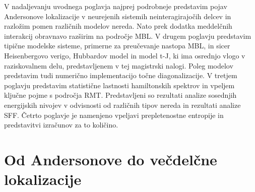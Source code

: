   V nadaljevanju uvodnega poglavja najprej podrobneje predstavim pojav Andersonove lokalizacije v neurejenih sistemih neinteragirajočih delcev in razložim pomen različnih modelov nereda. Nato prek dodatka meddelčnih interakcij obravnavo razširim na področje MBL. V drugem poglavju predstavim tipične modelske sisteme, primerne za preučevanje nastopa MBL, in sicer Heisenbergovo verigo, Hubbardov model in model t-J, ki ima osrednjo vlogo v raziskovalnem delu, predstavljenem v tej magistrski nalogi. Poleg modelov predstavim tudi numerično implementacijo točne diagonalizacije. V tretjem poglavju predstavim statistične lastnosti hamiltonskih spektrov in vpeljem ključne pojme s področja RMT. Predstavljeni so rezultati analize sosednjih energijskih nivojev v odvisnosti od različnih tipov nereda in rezultati analize SFF. Četrto poglavje je namenjeno vpeljavi prepletenostne entropije in predstavitvi izračunov za to količino. 





%
\chapter{Od Andersonove do večdelčne lokalizacije}
